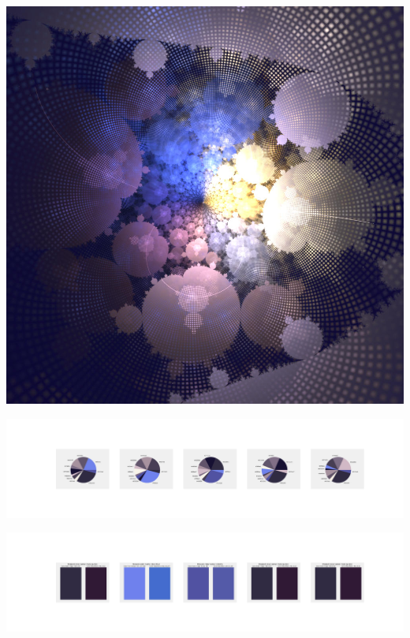 \documentclass[11pt]{article}
\begin{document}
\begin{landscape}
    \begin{center}
    \includegraphics[width=\textwidth]{./nbimg/file (253).jpg}
    \end{center}

    \begin{center}
    \includegraphics[width=250mm]{./nbimg/pie-171.jpg}
    \end{center}

    \begin{center}
    \includegraphics[width=250mm]{./nbimg/peak-171.jpg}
    \end{center}
    


\end{landscape}
\end{document}
